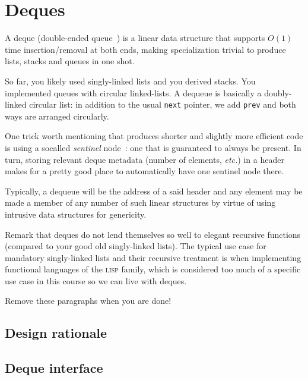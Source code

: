 \chapter{Deques}\label{chap:deques}

A deque (double-ended queue~\cite{wp:deque}) is a linear data structure that supports $O(1)$ time insertion/removal at both ends, making specialization trivial to produce lists, stacks and queues in one shot. 

So far, you likely used singly-linked lists and you derived stacks. You implemented queues with circular linked-lists. A dequeue is basically a doubly-linked circular list: in addition to the usual \texttt{next} pointer, we add \texttt{prev} and both ways are arranged circularly.

One trick worth mentioning that produces shorter and slightly more efficient code is using a socalled \textit{sentinel} node~\cite{drysdale:CS10}: one that is guaranteed to always be present. In turn, storing relevant deque metadata (number of elements, \textit{etc.}) in a header makes for a pretty good place to automatically have one sentinel node there.

Typically, a dequeue will be the address of a said header and any element may be made a member of any number of such linear structures by virtue of using intrusive data structures for genericity.

Remark that deques do not lend themselves so well to elegant recursive functions (compared to your good old singly-linked lists). The typical use case for mandatory singly-linked lists and their recursive treatment is when implementing functional languages of the \textsc{lisp} family, which is considered too much of a specific use case in this course so we can live with deques. 

Remove these paragraphs when you are done!

\section{Design rationale}

\section{Deque interface}\label{deques:interface}

